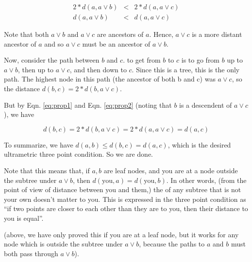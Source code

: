 \documentclass[12pt]{article}
\begin{document}
\begin{eqnarray*}
2*d(a, a \lor b) &<& 2*d(a, a \lor c)
\\ d(a, a \lor b) &<& d(a, a \lor c)
\end{eqnarray*} 

Note that both $a \lor b$ and $a \lor c$ are ancestors of $a$. Hence, $a \lor c$ is a more distant ancestor of $a$ and so $a \lor c$ must be an ancestor of $a \lor b$. 

Now, consider the path between $b$ and $c$.  to get from $b$ to $c$ is to go from $b$ up to $a \lor b$, then up to $a \lor c$, and then down to $c$. Since this is a tree, this is the only path. The highest node in this path (the ancestor of both b and c) was $a \lor c$, so the distance $d(b,c) = 2*d(b,a \lor c)$. 

But by Eqn. \ref{eq:prop1} and Eqn. \ref{eq:prop2} 
(noting that $b$ is a descendent of $a \lor c$), we have

\begin{equation*}
d(b,c) = 2*d(b,a \lor c) = 2*d(a,a \lor c) = d(a,c)
\end{equation*}

To summarize, we have $d(a,b) \leq d(b,c) = d(a,c)$, which is the desired ultrametric three point condition. So we are done.

Note that this means that, if $a,b$ are leaf nodes, and you are at a node outside the subtree under $a \lor b$, then $d(\textrm{you},a) = d(\textrm{you},b)$. In other words, (from the point of view of distance between you and them,) the  of any subtree that is not your own doesn't matter to you. This is expressed in the three point condition as ``if two points are closer to each other than they are to you, then their distance to you is equal''.

(above, we have only proved this if you are at a leaf node, but it works for any node which is outside the subtree under $a \lor b$, because the paths to $a$ and $b$ must both pass through $a \lor b$).
\end{document}
